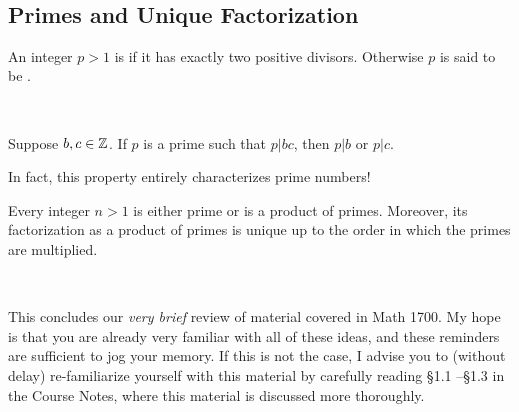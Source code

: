 \documentclass[11pt,fleqn,dvipsnames,usenames]{article}
\newcommand{\p}{\noindent}
\begin{document}
\begin{example*}~
\vspace{1cm}

\end{example*}

\subsection{Primes and Unique Factorization}

\begin{definition}
An integer $p > 1$ is  if it has exactly two positive divisors.  Otherwise $p$ is said to be .
\end{definition}
\vsmsp

\begin{example*}~
\vspace{1cm}

\end{example*}

\begin{theorem*}\label{euclidslemma}
Suppose $b,c\in\mathbb{Z}$.  If $p$ is a prime such that $p|bc$, then $p|b$ or $p|c$.
\end{theorem*}
\vsp

\begin{remark}
In fact, this property entirely characterizes prime numbers!
\end{remark}
\newpage

\begin{theorem}
Every integer $n > 1$ is either prime or is a product of primes.  Moreover, its factorization as a product of primes is unique up to the order in which the primes are multiplied.
\end{theorem}
%
\begin{examples*}~
\vspace{5cm}

\end{examples*}

\p This concludes our \emph{very brief} review of material covered in Math 1700.  My hope is that you are already very familiar with all of these ideas, and these reminders are sufficient to jog your memory.  If this is not the case, I advise you to (without delay) re-familiarize yourself with this material by carefully reading \S 1.1 \nolinebreak --\nolinebreak  \S 1.3 in the Course Notes, where this material is discussed more thoroughly.
\end{document}
